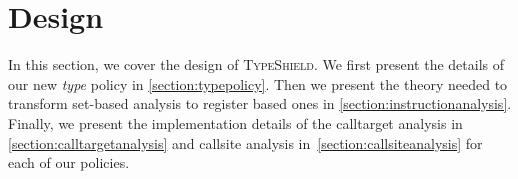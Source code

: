 \section{Design}
\label{chapter:Design}

In this section, we cover the design of \textsc{TypeShield}. 
We first present the details of our 
new \emph{type} policy in \cref{section:typepolicy}. 
Then we present the theory needed to transform set-based analysis to register based ones in \cref{section:instructionanalysis}. 
Finally, we present the implementation details of the calltarget analysis in 
\cref{section:calltargetanalysis} and callsite analysis in~\cref{section:callsiteanalysis} 
for each of our policies. 



